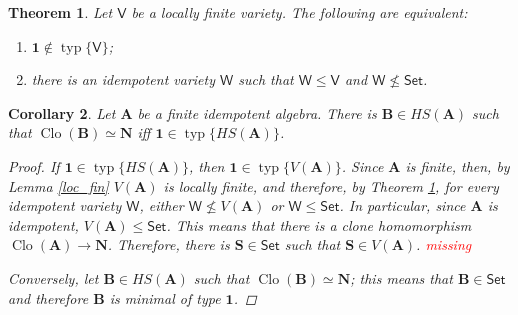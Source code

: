 \documentclass{amsart}
\theoremstyle{plain}
\newtheorem{theorem}{Theorem}[section]
\newtheorem{corollary}[theorem]{Corollary}
\theoremstyle{definition}
\theoremstyle{remark}
\DeclareMathOperator{\Clo}{Clo}
\DeclareMathOperator{\typ}{typ}
\begin{document}
\begin{theorem}
    \label{omitting_typ1}
    Let $\mathsf{V}$ be a locally finite variety. 
    The following are equivalent: 
    \begin{enumerate}
        \item $\mathbf{1} \notin \typ\{\mathsf{V}\}$; 
        \item there is an idempotent variety $\mathsf{W}$ such that $\mathsf{W} \le \mathsf{V}$ and $\mathsf{W} \nleq \mathsf{Set}$. 
    \end{enumerate}
\end{theorem}

\begin{corollary}
    Let $\mathbf{A}$ be a finite idempotent algebra. 
    There is $\mathbf{B} \in HS(\mathbf{A})$ such that $\Clo(\mathbf{B}) \simeq \mathbf{N}$ iff $\mathbf{1} \in \typ\{HS(\mathbf{A})\}$. 
    \begin{proof}
        If $\mathbf{1} \in \typ\{HS(\mathbf{A})\}$, then $\mathbf{1} \in \typ\{V(\mathbf{A})\}$. 
        Since $\mathbf{A}$ is finite, then, by Lemma \ref{loc_fin} $V(\mathbf{A})$ is locally finite, 
        and therefore, by Theorem \ref{omitting_typ1}, for every idempotent variety $\mathsf{W}$, either $\mathsf{W} \nleq V(\mathbf{A})$ or $\mathsf{W} \le \mathsf{Set}$. 
        In particular, since $\mathbf{A}$ is idempotent, $V(\mathbf{A}) \le \mathsf{Set}$. 
        This means that there is a clone homomorphism $\Clo(\mathbf{A}) \to \mathbf{N}$. 
        Therefore, there is $\mathbf{S} \in \mathsf{Set}$ such that $\mathbf{S} \in V(\mathbf{A})$. 
        \textcolor{red}{missing}

        Conversely, let $\mathbf{B} \in HS(\mathbf{A})$ such that $\Clo(\mathbf{B}) \simeq \mathbf{N}$; 
        this means that $\mathbf{B} \in \mathsf{Set}$ and therefore $\mathbf{B}$ is minimal of type $\mathbf{1}$. 
    \end{proof}
\end{corollary}
\end{document}
